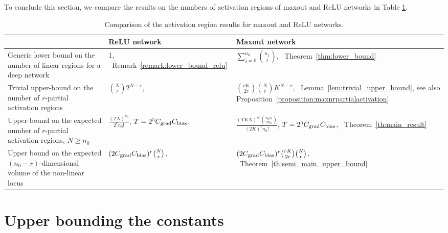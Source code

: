\documentclass{article}
\theoremstyle{definition}
\newcommand{\cbias}{C_{\text{\normalfont bias}}}
\newcommand{\cgrad}{C_{\text{\normalfont grad}}}
\newcommand{\nin}{n_0}
\begin{document}
To conclude this section, we compare the results on the numbers of activation regions of maxout and ReLU networks in Table \ref{tb:comparison}. 
\begin{table}[ht]
    \caption{Comparison of the activation region results for maxout and ReLU networks.}
    \label{tb:comparison}
    \centering
    {\small 
    \begin{tabular}{p{} >{\centering}p{} >{\centering\arraybackslash}p{} }
        \toprule
        & ReLU network & Maxout network \\
        \midrule
        Generic lower bound on the number of linear regions for a deep network & $1$, \  Remark~\ref{remark:lower_bound_relu} & $\sum_{j=0}^{\nin}{\binom{n_1}{j}}$, \ Theorem~\ref{thm:lower_bound} \\
        \midrule
        Trivial upper-bound on the number of $r$-partial activation regions & $\binom{N}{r} 2^{N - r}$, \ \citep[Theorem~10]{NIPS2019_8328} & $\binom{r K}{2r} \binom{N}{r} K^{N - r}$, \ Lemma~\ref{lem:trivial_upper_bound}, see also Proposition~\ref{proposition:maxnrpartialactivation}\\
        \midrule
        Upper-bound on the expected number of $r$-partial activation regions, $N \geq \nin$
        &
        $\frac{(T N)^{\nin}}{2^r \nin!}$, $T = 2^5 \cgrad \cbias$, \ \citep[Theorem~10]{NIPS2019_8328} 
        & 
        $\frac{(T K N)^{\nin} \binom{\nin K}{2 \nin} }{(2 K)^r \nin!}$, $T = 2^5 \cgrad \cbias$, \ Theorem~\ref{th:main_result}
        \\
        \midrule
        Upper bound on the expected $(\nin - r)$-dimensional volume of the non-linear locus
        & $(2 \cgrad \cbias)^r \binom{N}{r}$, \ \citep[Corollary~7]{pmlr-v97-hanin19a} & $(2 \cgrad \cbias)^r \binom{rK}{2r} \binom{N}{r}$, \ Theorem~\ref{th:semi_main_upper_bound} \\
        \bottomrule
    \end{tabular}
    }
\end{table}

\section{Upper bounding the constants}
\label{app:constants}
\end{document}
